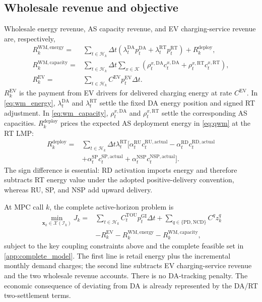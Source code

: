 \documentclass[final,5p,times]{elsarticle}
\newcommand{\dt}{\Delta t}
\newcommand{\EV}{\mathrm{EV}}
\newcommand{\DA}{\mathrm{DA}}
\newcommand{\RT}{\mathrm{RT}}
\newcommand{\GI}{\mathrm{GI}}
\newcommand{\TOU}{\mathrm{TOU}}
\newcommand{\PD}{\mathrm{PD}}
\newcommand{\NCD}{\mathrm{NCD}}
\newcommand{\RU}{\mathrm{RU}}
\newcommand{\RD}{\mathrm{RD}}
\newcommand{\SP}{\mathrm{SP}}
\newcommand{\NSP}{\mathrm{NSP}}
\newcommand{\WM}{\mathrm{WM}}
\newcommand{\actual}{\mathrm{actual}}
\newcommand{\calH}{\mathcal{H}}
\newcommand{\calK}{\mathcal{K}}
\begin{document}
\subsection{Wholesale revenue and objective}
Wholesale energy revenue, AS capacity revenue, and EV charging-service revenue
are, respectively,
\begin{align}
R_k^{\WM,\mathrm{energy}}
={}&\sum_{t\in\calH_k}\dt
\left(\lambda_t^{\DA}p_t^{\DA}
+\lambda_t^{\RT}p_t^{\RT}\right)+R_k^{\mathrm{deploy}}, \label{eq:wm_energy}\\
R_k^{\WM,\mathrm{capacity}}
={}&\sum_{t\in\calH_k}\dt\sum_{x\in\calK}
\left(\rho_t^{x,\DA}c_t^{x,\DA}
+\rho_t^{x,\RT}c_t^{x,\RT}\right), \label{eq:wm_capacity}\\
R_k^{\EV}
={}&\sum_{t\in\calH_k}C^{\EV}p_t^{\EV}\dt. \label{eq:ev_revenue}
\end{align}
$R_k^{\EV}$ is the payment from EV drivers for delivered charging energy at rate $C^{\EV}$. In \eqref{eq:wm_energy}, $\lambda_t^{\DA}$ and $\lambda_t^{\RT}$ settle the fixed
DA energy position and signed RT adjustment. In \eqref{eq:wm_capacity}, $\rho_t^{x,\DA}$ and $\rho_t^{x,\RT}$ settle the corresponding AS capacities. $R_k^{\mathrm{deploy}}$ prices the expected AS deployment energy in
\eqref{eq:qwm} at the RT LMP:
\begin{align}
R_k^{\mathrm{deploy}}
={}&\sum_{t\in\calH_k}\dt\lambda_t^{\RT}
\bigg[\alpha_t^{\RU}c_t^{\RU,\actual}
-\alpha_t^{\RD}c_t^{\RD,\actual}\nonumber\\
&+\alpha_t^{\SP}c_t^{\SP,\actual}
+\alpha_t^{\NSP}c_t^{\NSP,\actual}\bigg].
\label{eq:wm_deployment_revenue}
\end{align}
The sign difference is essential: RD activation imports energy and therefore
subtracts RT energy value under the adopted positive-delivery convention,
whereas RU, SP, and NSP add upward delivery.

At MPC call $k$, the complete active-horizon problem is
\begin{align}
\min_{\boldsymbol{x}_k\in\mathcal{X}(\mathcal{I}_k)}
J_k={}&
\sum_{t\in\calH_k}C_t^{\TOU}p_t^{\GI}\dt
+\sum_{q\in\{\PD,\NCD\}}C^qz_k^q \nonumber\\
&-R_k^{\EV}
-R_k^{\WM,\mathrm{energy}}
-R_k^{\WM,\mathrm{capacity}}, \label{eq:objective}
\end{align}
subject to the key coupling constraints above and the complete feasible set in \ref{app:complete_model}. The first line is retail energy plus the incremental monthly demand charges; the second line subtracts EV charging-service revenue and the two wholesale revenue accounts. There is no DA-tracking penalty. The economic consequence of deviating from DA is already represented by the DA/RT two-settlement terms.
\end{document}
